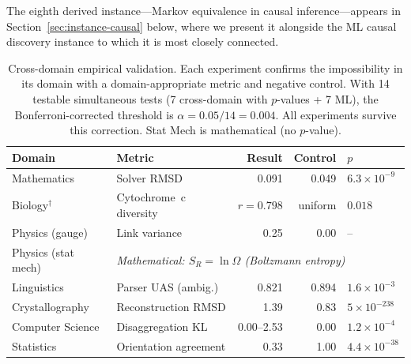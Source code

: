 \documentclass[11pt,a4paper]{article}
\begin{document}








The eighth derived instance---Markov equivalence in causal inference---appears
in Section~\ref{sec:instance-causal} below, where we present it alongside
the ML causal discovery instance to which it is most closely connected.

\begin{table}[t]
\centering
\caption{Cross-domain empirical validation.  Each experiment confirms the impossibility in its domain with a domain-appropriate metric and negative control.  With 14 testable simultaneous tests (7 cross-domain with $p$-values + 7 ML), the Bonferroni-corrected threshold is $\alpha = 0.05/14 = 0.004$.  All experiments survive this correction.  Stat Mech is mathematical (no $p$-value).}
\label{tab:cross-domain}
\begin{tabular}{llrrl}
\toprule
Domain & Metric & Result & Control & $p$ \\
\midrule
Mathematics & Solver RMSD & 0.091 & 0.049 & $6.3{\times}10^{-9}$ \\
Biology$^\dagger$ & Cytochrome~c diversity & $r = 0.798$ & uniform & $0.018$ \\
Physics (gauge) & Link variance & 0.25 & 0.00 & -- \\
Physics (stat mech) & \multicolumn{4}{l}{\textit{Mathematical: $S_R = \ln\Omega$ (Boltzmann entropy)}} \\
Linguistics & Parser UAS (ambig.) & 0.821 & 0.894 & $1.6{\times}10^{-3}$ \\
Crystallography & Reconstruction RMSD & 1.39 & 0.83 & $5{\times}10^{-238}$ \\
Computer Science & Disaggregation KL & 0.00--2.53 & 0.00 & $1.2{\times}10^{-4}$ \\
Statistics & Orientation agreement & 0.33 & 1.00 & $4.4{\times}10^{-38}$ \\
\bottomrule
\end{tabular}

\smallskip
{}
\end{table}
\end{document}
